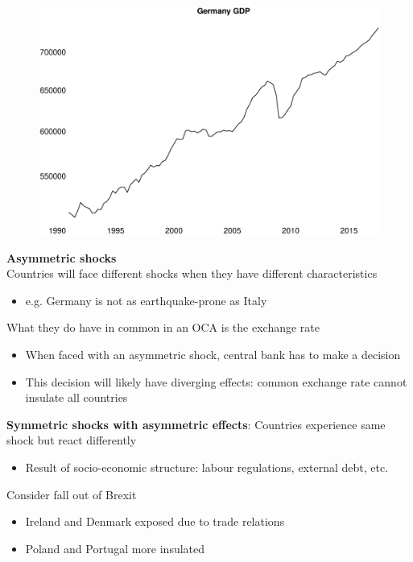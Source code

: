 \documentclass{beamer}
\begin{document}
\begin{frame}
  \begin{figure}
    \includegraphics[scale=.3]{germany_gdp.eps}
  \end{figure}
\end{frame}

\begin{frame}
  \textbf{Asymmetric shocks}\\
  Countries will face different shocks when they have different characteristics
  \begin{itemize}
    \item e.g. Germany is not as earthquake-prone as Italy
  \end{itemize}
  \medskip
  What they do have in common in an OCA is the exchange rate
  \begin{itemize}
    \item When faced with an asymmetric shock, central bank has to make a decision
    \item This decision will likely have diverging effects: common exchange rate cannot insulate all countries
  \end{itemize}
\end{frame}

\begin{frame}
  \textbf{Symmetric shocks with asymmetric effects}: Countries experience same shock but react differently
  \begin{itemize}
    \item Result of socio-economic structure: labour regulations, external debt, etc.
  \end{itemize}
  \medskip
  Consider fall out of Brexit
  \begin{itemize}
    \item Ireland and Denmark exposed due to trade relations
    \item Poland and Portugal more insulated
  \end{itemize}
\end{frame}
\end{document}
